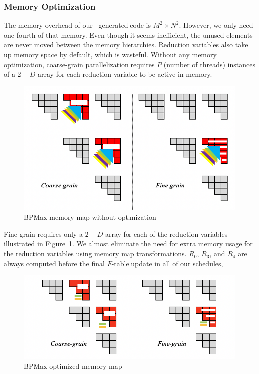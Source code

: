 \subsubsection{Memory Optimization}
The memory overhead of our \alphaz\ generated code is $M^2 \times N^2$. However, we only need one-fourth of that memory. Even though it seems inefficient, the unused elements are never moved between the memory hierarchies. Reduction variables also take up memory space by default, which is wasteful. Without any memory optimization, coarse-grain parallelization requires $P$ (number of threads) instances of a $2-D$ array for each reduction variable to be active in memory.
\begin{figure}[htbp]
\centerline{\includegraphics[scale=0.69,trim=5 5 5 5,clip]{content/figures/bpm_phase_2_memory_map.png}}
\caption{BPMax memory map without optimization}
\label{fig:bpm_phase_2_memory_map}
\end{figure}
Fine-grain requires only a $2-D$ array for each of the reduction variables illustrated in Figure~\ref{fig:bpm_phase_2_memory_map}. 
We almost eliminate the need for extra memory usage for the reduction variables using memory map transformations. $R_{0}$, $R_{3}$, and $R_{4}$ are always computed before the final $F$-table update in all of our schedules,
\begin{figure}[htbp]
\centerline{\includegraphics[scale=0.70, trim=5 5 5 5,clip]{content/figures/bpm_phase_3_memory_map.png}}
\caption{BPMax optimized memory map}
\label{fig:bpm_phase_3_memory_map}
\end{figure}
